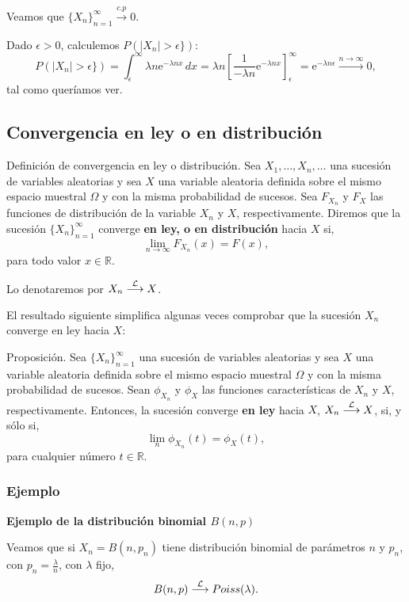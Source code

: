 \documentclass[]{book}
\begin{document}
Veamos que \(\{X_n\}_{n=1}^\infty\stackrel{c.p}{\longrightarrow} 0\).

Dado \(\epsilon >0\), calculemos \(P(|X_n|>\epsilon \})\):
\[
P(|X_n|>\epsilon \}) = \int_\epsilon^\infty \lambda n\mathrm{e}^{-\lambda n x}\, dx =\lambda n \left[\frac{1}{-\lambda n}\mathrm{e}^{-\lambda n x}\right]_\epsilon^\infty =\mathrm{e}^{-\lambda n \epsilon}\stackrel{n\to\infty}{\longrightarrow} 0,
\]
tal como queríamos ver.

\hypertarget{convergencia-en-ley-o-en-distribuciuxf3n}{%
\subsection{Convergencia en ley o en distribución}\label{convergencia-en-ley-o-en-distribuciuxf3n}}

 Definición de convergencia en ley o distribución.
Sea \(X_1,\ldots,X_n,\ldots\) una sucesión de variables aleatorias y sea \(X\) una variable aleatoria definida sobre el mismo espacio muestral \(\Omega\) y con la misma probabilidad de sucesos. Sea \(F_{X_n}\) y \(F_X\) las funciones de distribución de la variable \(X_n\) y \(X\), respectivamente. Diremos que la sucesión \(\{X_n\}_{n=1}^\infty\) converge \textbf{en ley, o en distribución} hacia \(X\) si,
\[
\lim_{n\to\infty} F_{X_n}(x)=F(x),
\]
para todo valor \(x\in\mathbb{R}\).

Lo denotaremos por \(X_n\stackrel{{\cal L}}{\longrightarrow}X\).

El resultado siguiente simplifica algunas veces comprobar que la sucesión \(X_n\) converge en ley hacia \(X\):

 Proposición.
Sea \(\{X_n\}_{n=1}^\infty\) una sucesión de variables aleatorias y sea \(X\) una variable aleatoria definida sobre el mismo espacio muestral \(\Omega\) y con la misma probabilidad de sucesos. Sean \(\phi_{X_n}\) y \(\phi_X\) las funciones características de \(X_n\) y \(X\), respectivamente. Entonces, la sucesión converge \textbf{en ley} hacia \(X\), \(X_n\stackrel{{\cal L}}{\longrightarrow}X\), si, y sólo si,
\[
\lim_{n} \phi_{X_n}(t) = \phi_X(t),
\]
para cualquier número \(t\in\mathbb{R}\).

\hypertarget{ejemplo-3}{%
\subsubsection{Ejemplo}\label{ejemplo-3}}

\textbf{Ejemplo de la distribución binomial \(B(n,p)\)}

Veamos que si \(X_n=B(n,p_n)\) tiene distribución binomial de parámetros \(n\) y \(p_n\), con \(p_n=\frac{\lambda}{n}\), con \(\lambda\) fijo,
\[
B(n,p)\stackrel{{\cal L}}{\longrightarrow}Poiss(\lambda).
\]
\end{document}

